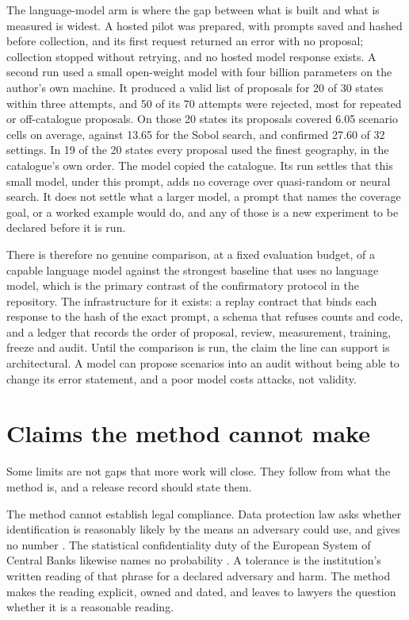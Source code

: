 The language-model arm is where the gap between what is built and what is measured is
widest. A hosted pilot was prepared, with prompts saved and hashed before collection,
and its first request returned an error with no proposal; collection stopped without
retrying, and no hosted model response exists.
A second run used a small open-weight model with four billion parameters on the
author's own machine. It produced a valid list of proposals for 20 of 30 states within
three attempts, and 50 of its 70 attempts were rejected, most for repeated or
off-catalogue proposals. On those 20 states its proposals covered 6.05 scenario cells
on average, against 13.65 for the Sobol search, and confirmed 27.60 of 32 settings. In
19 of the 20 states every proposal used the finest geography, in the catalogue's own
order. %
The model copied the catalogue. Its run settles that this small model, under this
prompt, adds no coverage over quasi-random or neural search. It does not settle what a
larger model, a prompt that names the coverage goal, or a worked example would do, and
any of those is a new experiment to be declared before it is run.

There is therefore no genuine comparison, at a fixed evaluation budget, of a
capable language model against the strongest baseline that uses no language model, which is the
primary contrast of the confirmatory protocol in the repository.
The infrastructure for it exists: a replay contract that binds each response to the
hash of the exact prompt, a schema that refuses counts and code, and a ledger that
records the order of proposal, review, measurement, training, freeze and audit. Until
the comparison is run, the claim the line can support is architectural. A model can
propose scenarios into an audit without being able to change its error statement, and
a poor model costs attacks, not validity.

\section{Claims the method cannot make}

Some limits are not gaps that more work will close. They follow from what the method
is, and a release record should state them.

The method cannot establish legal compliance. Data protection law asks whether
identification is reasonably likely by the means an adversary could use, and gives no
number \citep{gdpr2016}. The statistical confidentiality duty of the European System of
Central Banks likewise names no probability \citep{ec2533}. A tolerance is the
institution's written reading of that phrase for a declared adversary and harm. The
method makes the reading explicit, owned and dated, and leaves to lawyers the question
whether it is a reasonable reading.

